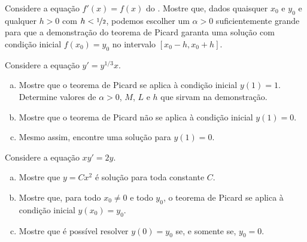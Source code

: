 \begin{exercise}
Considere a equação $f'(x) = f(x)$ do
. Mostre que, dados quaisquer $x_0$
e $y_0$ e qualquer $h > 0$ com $h < \nicefrac{1}{2}$, podemos escolher
um $\alpha > 0$ suficientemente grande para que a demonstração do teorema
de Picard garanta uma solução com condição inicial $f(x_0) = y_0$ no intervalo
$[x_0-h,x_0+h]$.
\end{exercise}

\begin{exercise}
\pagebreak[3]
Considere a equação $y' = y^{1/3}x$.
\begin{enumerate}[a)]
\item
Mostre que o teorema de Picard se aplica à condição inicial $y(1)=1$.
Determine valores de $\alpha > 0$, $M$, $L$ e $h$ que sirvam na demonstração.
\item
Mostre que o teorema de Picard não se aplica à condição inicial $y(1) = 0$.
\item
Mesmo assim, encontre uma solução para $y(1) = 0$.
\end{enumerate}
\end{exercise}

\begin{exercise}
Considere a equação $x y' = 2y$.
\begin{enumerate}[a)]
\item
Mostre que $y = Cx^2$ é solução para toda constante $C$.
\item
Mostre que, para todo $x_0 \neq 0$ e todo $y_0$, o teorema de Picard se
aplica à condição inicial $y(x_0) = y_0$.
\item
Mostre que é possível resolver $y(0) = y_0$ se, e somente se, $y_0 = 0$.
\end{enumerate}
\end{exercise}

